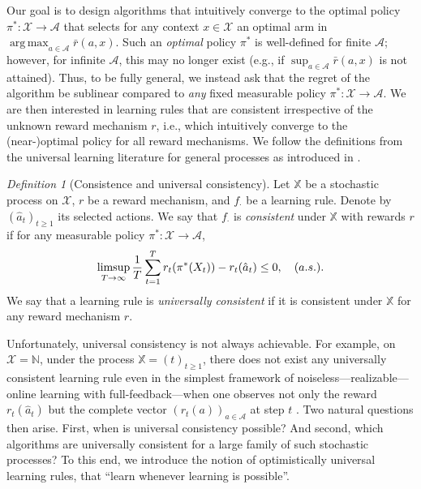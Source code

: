 \documentclass[aos]{imsart}
\theoremstyle{plain}
\theoremstyle{remark}
\newtheorem{definition}[theorem]{Definition}
\newcommand{\Acal}{\mathcal{A}}
\newcommand{\Xcal}{\mathcal{X}}
\newcommand{\Nbb}{\mathbb{N}}
\newcommand{\Xbb}{\mathbb{X}}
\newcommand{\1}{\mathbbm{1}}%
\DeclareMathOperator*{\argmax}{arg\,max}
\renewcommand{\limsup}{\mathop{\rm limsup}}
\begin{document}
Our goal is to design algorithms that intuitively converge to the optimal policy $\pi^*:\Xcal\to\Acal$ that selects for any context $x\in\Xcal$ an optimal arm in $\argmax_{a\in\Acal} \bar r(a, x)$.  Such an \emph{optimal} policy $\pi^*$ is well-defined for finite $\Acal$; however, for infinite $\Acal$, this may no longer exist (e.g., if $\sup_{a\in \Acal} \bar{r}(a, x)$ is not attained).  Thus, to be fully general, we 
instead ask that the regret of the algorithm be sublinear compared to \emph{any} fixed measurable policy $\pi^*:\Xcal\to\Acal$. We are then interested in learning rules that are consistent irrespective of the unknown reward mechanism $r$, i.e., which intuitively converge to the (near-)optimal policy for all reward mechanisms. We follow the definitions from the universal learning literature for general processes as introduced in \cite{hanneke:21}.

\begin{definition}[Consistence and universal consistency]
    Let $\Xbb$ be a stochastic process on $\Xcal$, $r$ be a reward mechanism, and $f_\cdot$ be a learning rule. Denote by $(\hat a_t)_{t\geq 1}$ its selected actions. We say that $f_\cdot$ is \emph{consistent} under $\Xbb$ with rewards $r$ if for any measurable policy $\pi^*:\Xcal\to\Acal$,
    \begin{equation*}
        \limsup_{T\to\infty}\frac{1}{T}\sum_{t=1}^T r_t(\pi^*(X_t)) - r_t(\hat a_t) \leq 0,\quad (a.s.).
    \end{equation*}
    We say that a learning rule is \emph{universally consistent} if it is consistent under $\Xbb$ for any reward mechanism $r$.
\end{definition}

Unfortunately, universal consistency is not always achievable. For example, on $\Xcal=\Nbb$, under the process $\Xbb=(t)_{t\geq 1}$, there does not exist any universally consistent learning rule even in the simplest framework of noiseless---realizable---online learning with full-feedback---when one observes not only the reward $r_t(\hat a_t)$ but the complete vector $(r_t(a))_{a\in\Acal}$ at step $t$ \cite{hanneke:21,blanchard:22a}. Two natural questions then arise. First, when is universal consistency possible? And second, which algorithms are universally consistent for a large family of such stochastic processes? To this end, we introduce the notion of optimistically universal learning rules, that ``learn whenever learning is possible''.
\end{document}
